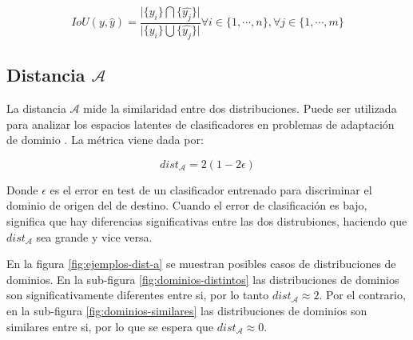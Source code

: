 \begin{equation}
    IoU(y, \hat{y}) = \frac{\lvert \{y_{i}\} \bigcap \{\hat{y_{j}}\}\rvert}{\lvert \{y_{i}\} \bigcup \{\hat{y_{j}}\}\rvert} \forall i \in \{1, \cdots, n\}, \forall j \in \{1, \cdots, m\}
\end{equation}

\subsection{Distancia $\mathcal{A}$}

La distancia $\mathcal{A}$ mide la similaridad entre dos distribuciones. Puede ser utilizada para analizar los espacios
latentes de clasificadores en problemas de adaptaci\'on de dominio \parencite{ben2006analysis}. La m\'etrica viene dada por:

\begin{equation}
    dist_\mathcal{A} = 2 (1-2\epsilon)
\end{equation}

Donde $\epsilon$ es el error en test de un clasificador entrenado para discriminar el dominio de origen del de destino.
Cuando el error de clasificaci\'on es bajo, significa que hay diferencias significativas entre las dos distrubiones,
haciendo que $dist_\mathcal{A}$ sea grande y vice versa.

En la figura \ref{fig:ejemplos-dist-a} se muestran posibles casos de distribuciones de dominios. En la sub-figura
\ref{fig:dominios-distintos} las distribuciones de dominios son significativamente diferentes entre si, por lo tanto
$dist_\mathcal{A} \approx 2$. Por el contrario, en la sub-figura \ref{fig:dominios-similares} las distribuciones de
dominios son similares entre si, por lo que se espera que $dist_\mathcal{A} \approx 0$.

